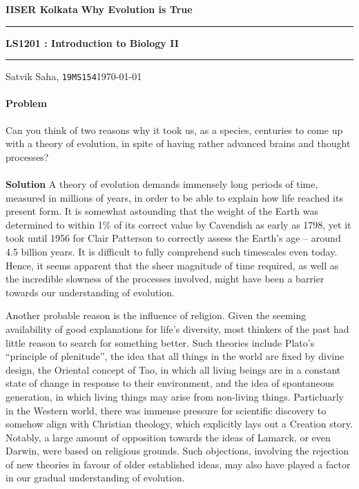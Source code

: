 \documentclass[10pt]{article}
\newcounter{prob}
\def\problem{\stepcounter{prob}\paragraph{Problem \arabic{prob}}}
\def\solution{\\\\\textbf{Solution }}
\begin{document}
        \par\textbf{IISER Kolkata} \hfill \textbf{Why Evolution is True}
        \vspace{3pt}
        \hrule
        \vspace{3pt}
        \begin{center}
                \LARGE{\textbf{LS1201 : Introduction to Biology II}}
        \end{center}
        \vspace{3pt}
        \hrule
        \vspace{3pt}
        Satvik Saha, \texttt{19MS154}\hfill\today
        \vspace{20pt}

        \problem Can you think of two reasons why it took us, as a species, centuries to come up with a theory of evolution,
        in spite of having rather advanced brains and thought processes?
        \solution A theory of evolution demands immensely long periods of time, measured in millions of years, in order to be able to
        explain how life reached its present form. It is somewhat astounding that the weight of the Earth was determined to within 1\%
        of its correct value by Cavendish as early as 1798, yet it took until 1956 for Clair Patterson to correctly assess the Earth's age --
        around 4.5 billion years. It is difficult to fully comprehend such timescales even today. Hence, it seems apparent that
        the sheer magnitude of time required, as well as the incredible slowness of the processes involved, might have been a barrier towards
        our understanding of evolution.

        Another probable reason is the influence of religion. Given the seeming availability of good explanations for life's diversity,
        most thinkers of the past had little reason to search for something better.
        Such theories include Plato's ``principle of plenitude'', the idea that all things in the world are fixed by divine design,
        the Oriental concept of Tao, in which all living beings are in a constant state of change in response to their environment,
        and the idea of spontaneous generation, in which living things may arise from non-living things.
        Particluarly in the Western world, there was immense pressure for scientific discovery to somehow align with Christian theology,
        which explicitly lays out a Creation story. Notably, a large amount of opposition towards the ideas of Lamarck, or even Darwin,
        were based on religious grounds. Such objections, involving the rejection of new theories in favour of older established ideas,
        may also have played a factor in our gradual understanding of evolution.
\end{document}

